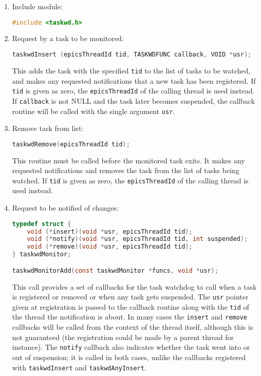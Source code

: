 \begin{enumerate}
\item Include module:

\begin{lstlisting}[language=C]
#include <taskwd.h>
\end{lstlisting}

\item Request by a task to be monitored:

\begin{lstlisting}[language=C]
taskwdInsert (epicsThreadId tid, TASKWDFUNC callback, VOID *usr);
\end{lstlisting}

This adds the task with the specified \verb|tid| to the list of tasks to be watched, and makes any requested notifications 
that a new task has been registered. If \verb|tid| is given as zero, the \verb|epicsThreadId| of the calling thread is used 
instead. If \verb|callback| is not NULL and the task later becomes suspended, the callback routine will be called with 
the single argument \verb|usr|.

\item Remove task from list:

\begin{lstlisting}[language=C]
taskwdRemove(epicsThreadId tid);
\end{lstlisting}

This routine must be called before the monitored task exits. It makes any requested notifications and removes the 
task from the list of tasks being watched. If \verb|tid| is given as zero, the \verb|epicsThreadId| of the calling thread is 
used instead.

\item Request to be notified of changes:

\begin{lstlisting}[language=C]
typedef struct {
    void (*insert)(void *usr, epicsThreadId tid);
    void (*notify)(void *usr, epicsThreadId tid, int suspended);
    void (*remove)(void *usr, epicsThreadId tid);
} taskwdMonitor;

taskwdMonitorAdd(const taskwdMonitor *funcs, void *usr);
\end{lstlisting}

This call provides a set of callbacks for the task watchdog to call when a task is registered or removed or when any 
task gets suspended. The \verb|usr| pointer given at registration is passed to the callback routine along with the \verb|tid| of 
the thread the notification is about. In many cases the \verb|insert| and \verb|remove| callbacks will be called from the 
context of the thread itself, although this is not guaranteed (the registration could be made by a parent thread for 
instance). The \verb|notify| callback also indicates whether the task went into or out of suspension; it is called in both 
cases, unlike the callbacks registered with \verb|taskwdInsert| and \verb|taskwdAnyInsert|.


\end{enumerate}
